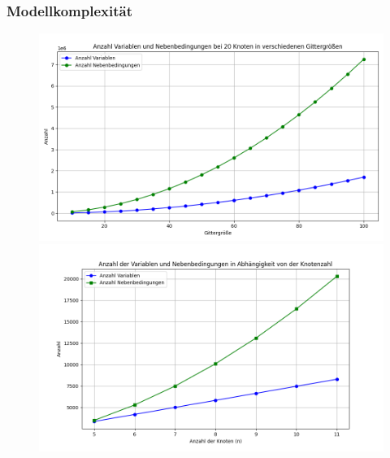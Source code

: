 \documentclass[9pt]{beamer}
\begin{document}
    \begin{frame}
    \frametitle{Modellkomplexität}
    \begin{figure}
        \centering
        \begin{minipage}{0.48\textwidth}
            \centering
            \includegraphics[width=\linewidth]{figures/20NodesVarNEb.png}
        \end{minipage}\hfill
        \begin{minipage}{0.48\textwidth}
            \centering
            \includegraphics[width=\linewidth]{figures/VariabelConstrains5-11.png}
        \end{minipage}
    \end{figure}
    \end{frame}
\end{document}
